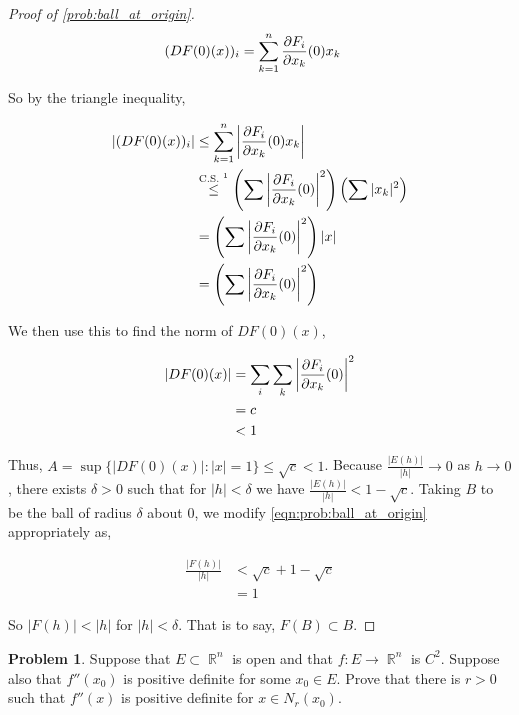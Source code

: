 \documentclass[english]{article}
\DeclareMathOperator{\R}{\mathbb{R}}
\DeclareMathOperator{\<}{\langle}
\renewcommand{\>}{\rangle}
\theoremstyle{definition}
\newtheorem{problem}[theorem]{Problem}
\begin{document}
\begin{proof}[Proof of \cref{prob:ball_at_origin}]
    \begin{align*}
        (DF(0)(x))_i 
        & = \sum_{k = 1}^n {\partial F_i \over \partial x_k} (0) x_k 
    \end{align*}

    So by the triangle inequality,

    \begin{align*}
        \left| (DF(0)(x))_i \right|
        & \leq \sum_{k = 1}^n \left| {\partial F_i \over \partial x_k} (0) x_k \right| \\
        & \overset{\text{C.S. \footnotemark}}{\leq} \left( \sum \left| {\partial F_i \over \partial x_k} (0) \right|^2 \right) \left( \sum |x_k|^2 \right) \\
        & = \left( \sum \left| {\partial F_i \over \partial x_k} (0) \right|^2 \right) |x| \\
        & = \left( \sum \left| {\partial F_i \over \partial x_k} (0) \right|^2 \right)
    \end{align*}
    
    We then use this to find the norm of $DF(0)(x)$,

    \begin{align*}
        |DF(0)(x)| 
        & = \sum_i \sum_k \left| {\partial F_i \over \partial x_k} (0) \right|^2 \\
        & = c \\
        & < 1
    \end{align*}

    Thus, $A = \sup \{\left|DF(0)(x)\right| : |x| = 1\} \leq \sqrt{c} < 1$. Because $\frac{|E(h)|}{|h|} \to 0$ as $h \to 0$, there exists $\delta > 0$ such that for $|h| < \delta$ we have $\frac{|E(h)|}{|h|} < 1 - \sqrt{c}$. Taking $B$ to be the ball of radius $\delta$ about 0, we modify \cref{eqn:prob:ball_at_origin} appropriately as,

    \begin{align*}
        \frac{|F(h)|}{|h|}
        & < \sqrt{c} + 1 - \sqrt{c} \\
        & = 1
    \end{align*}

    So $|F(h)| < |h|$ for $|h| < \delta$. That is to say, $F(B) \subset B$.
\end{proof}

\begin{problem}
    \label{prob:small_ball}
    Suppose that $E \subset \R^n$ is open and that $f: E \to \R^n$ is $C^2$. Suppose also that $f''(x_0)$ is positive definite for some $x_0 \in E$. Prove that there is $r > 0$ such that $f''(x)$ is positive definite for $x \in N_r(x_0)$.
\end{problem}
\end{document}
